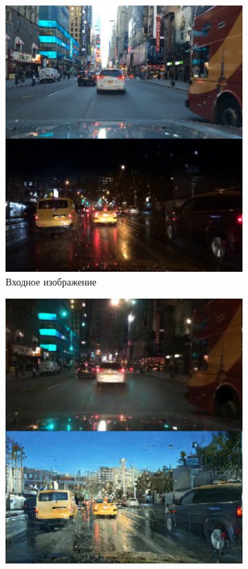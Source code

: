 \documentclass[11pt,a4paper]{extarticle}
\begin{document}
{			\begin{figure}[ht]
				\centering
				\begin{subfigure}[ht]{0.32\textwidth}
					\includegraphics[width=\textwidth]{img/aug_input}
					\caption{Входное изображение}
				\end{subfigure}
				\begin{subfigure}[ht]{0.32\textwidth}
					\includegraphics[width=\textwidth]{img/aug_cyclegan}

\end{subfigure}
\end{figure}}
\end{document}
